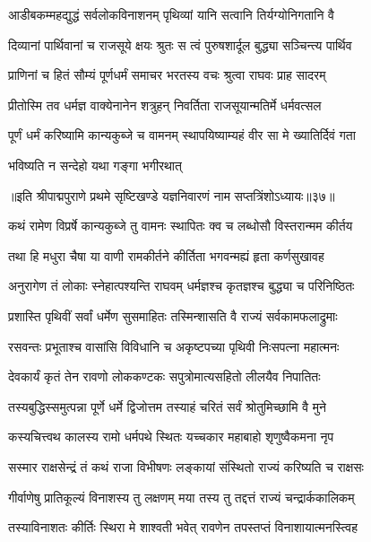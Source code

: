 \twolineshloka
{आडीबकम्महद्युद्धं सर्वलोकविनाशनम्}
{पृथिव्यां यानि सत्वानि तिर्यग्योनिगतानि वै}%

\twolineshloka
{दिव्यानां पार्थिवानां च राजसूये क्षयः श्रुतः}
{स त्वं पुरुषशार्दूल बुद्ध्या सञ्चिन्त्य पार्थिव}%

\twolineshloka
{प्राणिनां च हितं सौम्यं पूर्णधर्मं समाचर}
{भरतस्य वचः श्रुत्वा राघवः प्राह सादरम्}%

\twolineshloka
{प्रीतोस्मि तव धर्मज्ञ वाक्येनानेन शत्रुहन्}
{निवर्तिता राजसूयान्मतिर्मे धर्मवत्सल}%

\twolineshloka
{पूर्णं धर्मं करिष्यामि कान्यकुब्जे च वामनम्}
{स्थापयिष्याम्यहं वीर सा मे ख्यातिर्दिवं गता}%

\onelineshloka
{भविष्यति न सन्देहो यथा गङ्गा भगीरथात्}%

{॥इति श्रीपाद्मपुराणे प्रथमे सृष्टिखण्डे यज्ञनिवारणं नाम सप्तत्रिंशोऽध्यायः॥३७॥}



\twolineshloka
{कथं रामेण विप्रर्षे कान्यकुब्जे तु वामनः}
{स्थापितः क्व च लब्धोसौ विस्तरान्मम कीर्तय}%

\twolineshloka
{तथा हि मधुरा चैषा या वाणी रामकीर्तने}
{कीर्तिता भगवन्मह्यं हृता कर्णसुखावह}%

\twolineshloka
{अनुरागेण तं लोकाः स्नेहात्पश्यन्ति राघवम्}
{धर्मज्ञश्च कृतज्ञश्च बुद्ध्या च परिनिष्ठितः}%

\twolineshloka
{प्रशास्ति पृथिवीं सर्वां धर्मेण सुसमाहितः}
{तस्मिन्शासति वै राज्यं सर्वकामफलाद्रुमाः}%

\twolineshloka
{रसवन्तः प्रभूताश्च वासांसि विविधानि च}
{अकृष्टपच्या पृथिवी निःसपत्ना महात्मनः}%

\twolineshloka
{देवकार्यं कृतं तेन रावणो लोककण्टकः}
{सपुत्रोमात्यसहितो लीलयैव निपातितः}%

\twolineshloka
{तस्यबुद्धिस्समुत्पन्ना पूर्णे धर्मे द्विजोत्तम}
{तस्याहं चरितं सर्वं श्रोतुमिच्छामि वै मुने}%


\twolineshloka
{कस्यचित्त्वथ कालस्य रामो धर्मपथे स्थितः}
{यच्चकार महाबाहो शृणुष्वैकमना नृप}%

\twolineshloka
{सस्मार राक्षसेन्द्रं तं कथं राजा विभीषणः}
{लङ्कायां संस्थितो राज्यं करिष्यति च राक्षसः}%

\twolineshloka
{गीर्वाणेषु प्रातिकूल्यं विनाशस्य तु लक्षणम्}
{मया तस्य तु तद्दत्तं राज्यं चन्द्रार्ककालिकम्}%

\twolineshloka
{तस्याविनाशतः कीर्तिः स्थिरा मे शाश्वती भवेत्}
{रावणेन तपस्तप्तं विनाशायात्मनस्त्विह}%

